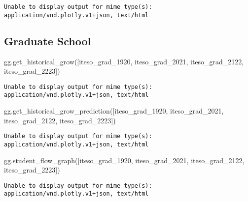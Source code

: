 \documentclass[
  letterpaper,
  DIV=11,
  numbers=noendperiod]{scrartcl}
\newenvironment{Shaded}{\begin{snugshade}}{\end{snugshade}}
\newcommand{\NormalTok}[1]{\textcolor[rgb]{0.00,0.23,0.31}{#1}}
\begin{document}
\begin{verbatim}
Unable to display output for mime type(s): application/vnd.plotly.v1+json, text/html
\end{verbatim}

\subsection{Graduate School}\label{graduate-school-1}

\begin{Shaded}
\begin{Highlighting}[]
\NormalTok{gg.get\_historical\_grow([iteso\_grad\_1920, iteso\_grad\_2021, iteso\_grad\_2122, iteso\_grad\_2223])}
\end{Highlighting}
\end{Shaded}

\begin{verbatim}
Unable to display output for mime type(s): application/vnd.plotly.v1+json, text/html
\end{verbatim}

\begin{Shaded}
\begin{Highlighting}[]
\NormalTok{gg.get\_historical\_grow\_prediction([iteso\_grad\_1920, iteso\_grad\_2021, }
\NormalTok{                                    iteso\_grad\_2122, iteso\_grad\_2223])}
\end{Highlighting}
\end{Shaded}

\begin{verbatim}
Unable to display output for mime type(s): application/vnd.plotly.v1+json, text/html
\end{verbatim}

\begin{Shaded}
\begin{Highlighting}[]
\NormalTok{gg.student\_flow\_graph([iteso\_grad\_1920, iteso\_grad\_2021, iteso\_grad\_2122, iteso\_grad\_2223])}
\end{Highlighting}
\end{Shaded}

\begin{verbatim}
Unable to display output for mime type(s): application/vnd.plotly.v1+json, text/html
\end{verbatim}
\end{document}

